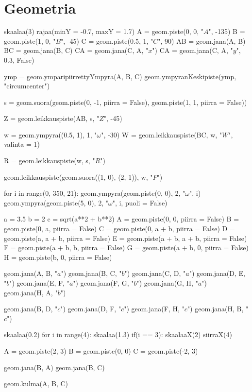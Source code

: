 \section{Geometria}
\begin{kuva}
skaalaa(3)
rajaa(minY = -0.7, maxY = 1.7)
A = geom.piste(0, 0, "$A$", -135)
B = geom.piste(1, 0, "$B$", -45)
C = geom.piste(0.5, 1, "$C$", 90)
AB = geom.jana(A, B)
BC = geom.jana(B, C)
CA = geom.jana(C, A, "$x$")
CA = geom.jana(C, A, "$y$", 0.3, False)

ymp = geom.ymparipiirrettyYmpyra(A, B, C)
geom.ympyranKeskipiste(ymp, "circumcenter")

s = geom.suora(geom.piste(0, -1, piirra = False), geom.piste(1, 1, piirra = False))

Z = geom.leikkauspiste(AB, s, "$Z$", -45)

w = geom.ympyra((0.5, 1), 1, "$\omega$", -30)
W = geom.leikkauspiste(BC, w, "$W$", valinta = 1)

R = geom.leikkauspiste(w, s, "$R$")

geom.leikkauspiste(geom.suora((1, 0), (2, 1)), w, "$P$")
\end{kuva}

\begin{kuva}
for i in range(0, 350, 21):
	geom.ympyra(geom.piste(0, 0), 2, "$\omega$", i)
	geom.ympyra(geom.piste(5, 0), 2, "$\omega$", i, puoli = False)

\end{kuva}

\begin{kuva}
a = 3.5
b = 2
c = sqrt(a**2 + b**2)
A = geom.piste(0, 0, piirra = False)
B = geom.piste(0, a, piirra = False)
C = geom.piste(0, a + b, piirra = False)
D = geom.piste(a, a + b, piirra = False)
E = geom.piste(a + b, a + b, piirra = False)
F = geom.piste(a + b, b, piirra = False)
G = geom.piste(a + b, 0, piirra = False)
H = geom.piste(b, 0, piirra = False)

geom.jana(A, B, "$a$")
geom.jana(B, C, "$b$")
geom.jana(C, D, "$a$")
geom.jana(D, E, "$b$")
geom.jana(E, F, "$a$")
geom.jana(F, G, "$b$")
geom.jana(G, H, "$a$")
geom.jana(H, A, "$b$")

geom.jana(B, D, "$c$")
geom.jana(D, F, "$c$")
geom.jana(F, H, "$c$")
geom.jana(H, B, "$c$")
\end{kuva}

\begin{kuva}
skaalaa(0.2)
for i in range(4):
	skaalaa(1.3)
	if(i == 3): skaalaaX(2)
	siirraX(4)
	
	A = geom.piste(2, 3)
	B = geom.piste(0, 0)
	C = geom.piste(-2, 3)

	geom.jana(B, A)
	geom.jana(B, C)

	geom.kulma(A, B, C)
\end{kuva}

